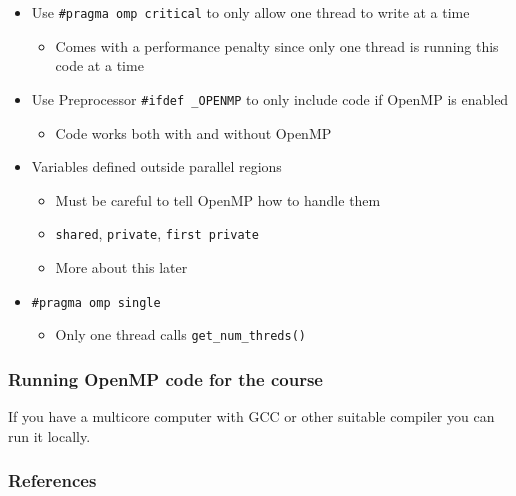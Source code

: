 \begin{itemize}
\itemsep1pt\parskip0pt
\item
  Use \texttt{\#pragma omp critical} to only allow one thread to write
  at a time

  \begin{itemize}
  \itemsep1pt\parskip0pt
  \item
    Comes with a performance penalty since only one thread is running
    this code at a time
  \end{itemize}
\item
  Use Preprocessor \texttt{\#ifdef \_OPENMP} to only include code if
  OpenMP is enabled

  \begin{itemize}
  \itemsep1pt\parskip0pt
  \item
    Code works both with and without OpenMP
  \end{itemize}
\item
  Variables defined outside parallel regions

  \begin{itemize}
  \itemsep1pt\parskip0pt
  \item
    Must be careful to tell OpenMP how to handle them
  \item
    \texttt{shared}, \texttt{private}, \texttt{first private}
  \item
    More about this later
  \end{itemize}
\item
  \texttt{\#pragma omp single}

  \begin{itemize}
  \itemsep1pt\parskip0pt
  \item
    Only one thread calls \texttt{get\_num\_threds()}
  \end{itemize}
\end{itemize}

\subsubsection{Running OpenMP code for the
course}\label{running-openmp-code-for-the-course}

If you have a multicore computer with GCC or other suitable compiler you
can run it locally.

\subsubsection{References}\label{references}

